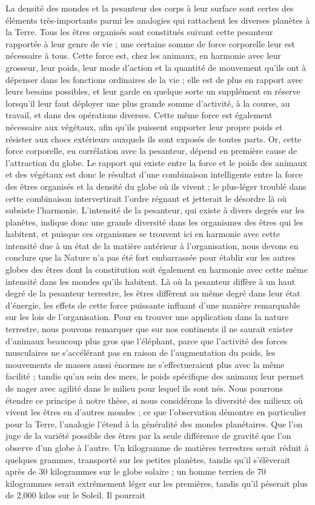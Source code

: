 \documentclass[a4paper, 11pt, oneside, landscape]{article}
\begin{document}
La densité des mondes et la pesanteur des corps à leur surface sont certes des éléments très-importants parmi les analogies qui rattachent les diverses planètes à la Terre. Tous les êtres organisés sont constitués suivant cette pesanteur rapportée à leur genre de vie ; une certaine somme de force corporelle leur est nécessaire à tous. Cette force est, chez les animaux, en harmonie avec leur grosseur, leur poids, leur mode d'action et la quantité de mouvement qu'ils ont à dépenser dans les fonctions ordinaires de la vie ; elle est de plus en rapport avec leurs besoins possibles, et leur garde en quelque sorte un supplément en réserve lorsqu'il leur faut déployer une plus grande somme d'activité, à la course, au travail, et dans des opérations diverses. Cette même force est également nécessaire aux végétaux, afin qu'ils puissent supporter leur propre poids et résister aux chocs extérieurs auxquels ils sont exposés de toutes parts. Or, cette force corporelle, eu corrélation avec la pesanteur, dépend en première cause de l'attraction du globe. Le rapport qui existe entre la force et le poids des animaux et des végétaux est donc le résultat d'une combinaison intelligente entre la force des êtres organisés et la densité du globe où ils vivent ; le plus-léger troublé dans cette combinaison intervertirait l'ordre régnant et jetterait le désordre là où subsiste l'harmonie. L'intensité de la pesanteur, qui existe à divers degrés sur les planètes, indique donc une grande diversité dans les organismes des êtres qui les habitent, et puisque ces organismes se trouvent ici en harmonie avec cette intensité due à un état de la matière antérieur à l'organisation, nous devons en conclure que la Nature n'a pas été fort embarrassée pour établir sur les autres globes des êtres dont la constitution soit également en harmonie avec cette même intensité dans les mondes qu'ils habitent. Là où la pesanteur diffère à un haut degré de la pesanteur terrestre, les êtres diffèrent au même degré dans leur état d'énergie, les effets de cette force puissante influant d'une manière remarquable sur les lois de l'organisation. Pour en trouver une application dans la nature terrestre, nous pouvons remarquer que sur nos continents il ne saurait exister d'animaux beaucoup plus gros que l'éléphant, parce que l'activité des forces musculaires ne s'accélérant pas en raison de l'augmentation du poids, les mouvements de masses aussi énormes ne s'effectueraient plus avec la même facilité ; tandis qu'au sein des mers, le poids spécifique des animaux leur permet de nager avec agilité dans le milieu pour lequel ils sont nés. Nous pourrons étendre ce principe à notre thèse, si nous considérons la diversité des milieux où vivent les êtres en d'autres mondes ; ce que l'observation démontre en particulier pour la Terre, l'analogie l'étend à la généralité des mondes planétaires. Que l'on juge de la variété possible des êtres par la seule différence de gravité que l'on observe d'un globe à l'autre. Un kilogramme de matières terrestres serait réduit à quelques grammes, transporté sur les petites planètes, tandis qu'il s'élèverait après de 30 kilogrammes sur le globe solaire ; un homme terrien de 70 kilogrammes serait extrêmement léger sur les premières, tandis qu'il pèserait plus de 2,000 kilos sur le Soleil. Il pourrait 
\end{document}
